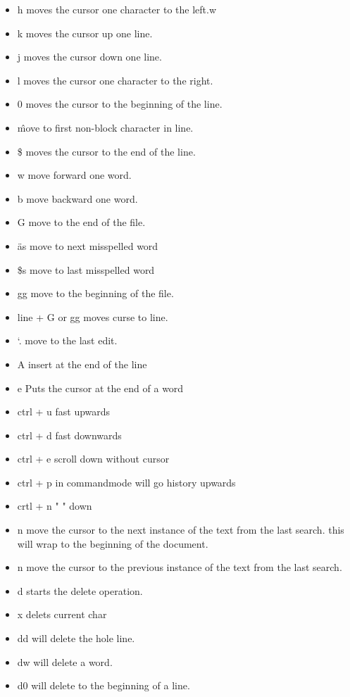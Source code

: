 \documentclass[12pt]{article}
\begin{document}
\begin{itemize}

    \item h moves the cursor one character to the left.w
    \item k moves the cursor up one line.
    \item j moves the cursor down one line.
    \item l moves the cursor one character to the right.
    \item 0 moves the cursor to the beginning of the line.
    \item \^ move to first non-block character in line. 
    \item \$ moves the cursor to the end of the line.
    \item w move forward one word.
    \item b move backward one word.
    \item G move to the end of the file.
    \item äs move to next misspelled word
    \item \$s move to last misspelled word
    \item gg move to the beginning of the file.
    \item line + G or gg moves curse to line.
    \item `. move to the last edit.
    \item A insert at the end of the line
    \item e  Puts the cursor at the end of a word
    \item ctrl + u  fast upwards
    \item ctrl + d  fast downwards
    \item ctrl + e  scroll down without cursor
    \item ctrl + p in commandmode will go history upwards
    \item crtl + n "                            " down
    \item n move the cursor to the next instance of the text from the last search. this will wrap to the beginning of the document.
    \item n move the cursor to the previous instance of the text from the last search.
    \item d starts the delete operation.
    \item x delets current char
    \item dd will delete the hole line.
    \item dw will delete a word.
    \item d0 will delete to the beginning of a line.

\end{itemize}
\end{document}
